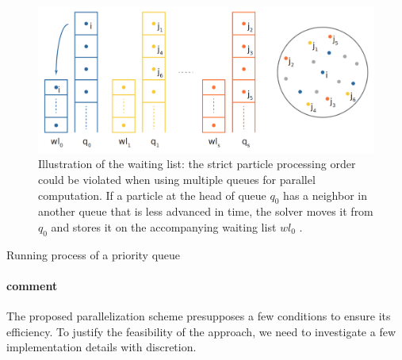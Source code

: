 \documentclass[
	11pt, 
	DIV10,
	ngerman,
	a4paper, 
	oneside, 
	headings=normal, 
	captions=tableheading,
	final, 
	numbers=noenddot
]{scrartcl}
\begin{document}
\begin{figure}[tb]
	\centering
	\includegraphics[scale=0.25]{images/6}
	\caption{\label{fig5} Illustration of the waiting list: the strict particle processing order could be violated when using multiple queues for parallel computation. If a particle at the head of queue $ q_{0} $ has a neighbor in another queue that is less advanced in time, the solver moves it from $ q_{0} $ and stores it on the accompanying waiting list $ wl_{0} $ \cite{reinhardt2017fully}.}
\end{figure}

\large
\vskip 0.2in
\begin{algorithm}
	\DontPrintSemicolon
	\SetAlgoLined
	\SetAlCapNameFnt{\large}
	\SetAlCapFnt{\large}
	\caption{\label{alg3} Running process of a priority queue \cite{reinhardt2017fully}}
\end{algorithm}
\vskip 0.2in
\normalsize

\paragraph{comment}
The proposed parallelization scheme presupposes a few conditions to ensure its efficiency. To justify the feasibility of the approach, we need to investigate a few implementation details with discretion.
\end{document}
